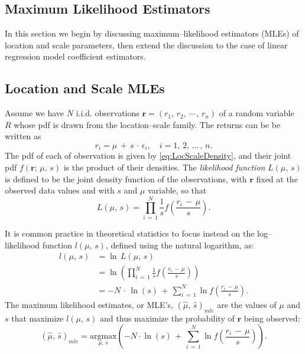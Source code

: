 \documentclass[graybox,envcountchap,sectrefs]{svmono}\usepackage[]{graphicx}\usepackage[]{xcolor}
\begin{document}
\begin{appendices}
\section{Maximum Likelihood Estimators \label{sec: MLEs}}

In this section we begin by discussing maximum--likelihood estimators
(MLEs) of location and scale parameters, then extend the discussion
to the case of linear regression model coefficient estimators.


\subsection{Location and Scale MLEs\label{subsec:LocationandScaleMLEs}}

Assume we have $N$ i.i.d. observations $\mathbf{r}=(r_{1},\,r_{2},\,\cdots\,,\,r_{n})$
of a random variable $R$ whose pdf is drawn from the location--scale
family. The returns can be be written as
\begin{equation}
r_{i}=\mu\,+\,s\,\cdot\,\epsilon_{i},\quad i=1,\,2,\,\ldots\,,\,n.\label{eq: locScaleModReturns}
\end{equation}
The pdf of each of observation is given by \eqref{eq:LocScaleDensity},
and their joint pdf $f(\mathbf{r};\,\mu,\,s)$ is the product of their
densities. The \emph{likelihood function} $L(\mu,\,s)$ is defined
to be the joint density function of the observations, with $\mathbf{r}$
fixed at the observed data values and with $s$ and $\mu$ variable,
so that
\begin{equation}
L(\mu,\,s)=\prod_{i\,=\,1}^{N}\frac{1}{s}f\left(\frac{r_{i}\,-\,\mu}{s}\right).\label{eq:LikelihoodLocScale}
\end{equation}

It is common practice in theoretical statistics to focus instead on
the log--likelihood function $l(\mu,\,s)$, defined using the natural
logarithm, as:
\begin{align}
l(\mu,\,s) & =\ln\,L(\mu,\,s)\nonumber \\
 & =\ln\left(\prod_{i\,=\,1}^{N}\frac{1}{s}f\left(\frac{r_{i}\,-\,\mu}{s}\right)\right)\nonumber \\
 & =-N\,\cdot\,\ln(s)\,+\,\sum_{i\,=\,1}^{N}\ln f\left(\frac{r_{i}\,-\,\mu}{s}\right).\label{eq:LogLikelihoodLocScale}
\end{align}
The maximum likelihood estimates, or MLE's, $(\hat{\mu},\,\hat{s})_{mle}$
are the values of $\mu$ and $s$ that maximize $l(\mu,\,s)$ and
thus maximize the probability of $\mathbf{r}$ being observed:
\begin{equation}
(\hat{\mu},\,\hat{s})_{mle}=\underset{\mu,\,s}{\mathrm{argmax}}\left(-N\cdot\ln(s)\,+\,\sum_{i\,=\,1}^{N}\ln f\left(\frac{r_{i}\,-\,\mu}{s}\right)\right).\label{eq:JointMLEmuSigma}
\end{equation}


\end{appendices}
\end{document}
